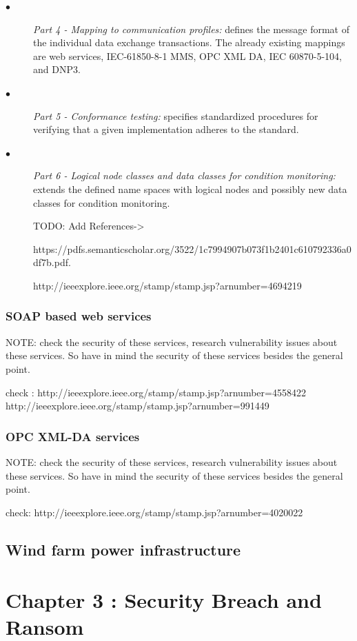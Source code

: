\documentclass[twosided,a4,10pt]{article}
\begin{document}
\begin{multicols}{2}
\begin{description}
  		\item[$\bullet$] 
  			 \textit{Part 4 - Mapping to communication profiles:} defines the message format of the individual data exchange transactions. The already existing mappings are web services, IEC-61850-8-1 MMS, OPC XML DA, IEC 60870-5-104, and DNP3. 	
  		\item[$\bullet$]	
  		 	 \textit{Part 5 - Conformance testing:} specifies standardized procedures for verifying that a given implementation adheres to the standard.
  		\item[$\bullet$]	
  			\textit{Part 6 - Logical node classes and data classes for condition monitoring:} extends the defined name spaces with logical nodes and possibly new data classes for condition monitoring.
  			
  			TODO: Add References->
  		
  			https://pdfs.semanticscholar.org/3522/1c7994907b073f1b2401c610792336a0df7b.pdf.
  		
  			http://ieeexplore.ieee.org/stamp/stamp.jsp?arnumber=4694219
  		
  	\end{description}
  \subsubsection{SOAP based web services}
  	NOTE: check the security of these services, research vulnerability issues about these services. So have in mind the security of these services besides the general point.
  	
  	check : http://ieeexplore.ieee.org/stamp/stamp.jsp?arnumber=4558422
  	http://ieeexplore.ieee.org/stamp/stamp.jsp?arnumber=991449
  \subsubsection{OPC XML-DA services}	
   	NOTE: check the security of these services, research vulnerability issues about these services. So have in mind the security of these services besides the general point.
   	
   	check: http://ieeexplore.ieee.org/stamp/stamp.jsp?arnumber=4020022
 \subsection{Wind farm power infrastructure}
  \lipsum[1]
\section{Chapter 3 : Security Breach and Ransom }
 \lipsum[1]
 

\end{multicols}
\end{document}
